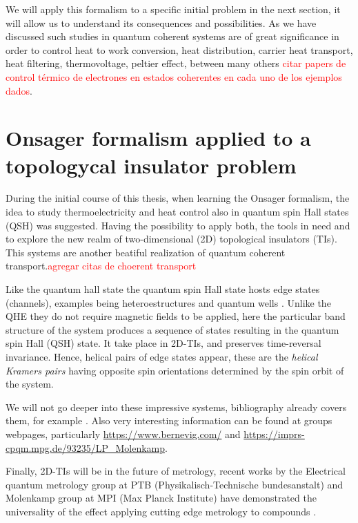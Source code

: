 We will apply this formalism to a specific initial problem in the next section, it will allow us to understand its consequences and possibilities. As we have discussed such studies in quantum coherent systems are of great significance in order to control heat to work conversion, heat distribution, carrier heat transport, heat filtering, thermovoltage, peltier effect, between many others \textcolor{red}{citar papers de control térmico de electrones en estados coherentes en cada uno de los ejemplos dados}.


\section{Onsager formalism applied to a\\ topologycal insulator problem}
\label{sec:teo:onsaTopo}


During the initial course of this thesis, when  learning the Onsager formalism, the idea to study thermoelectricity and heat control also in quantum spin Hall states (QSH) was suggested. Having the possibility to apply both, the tools in need and to explore the new realm of two-dimensional (2D) topological insulators (TIs). This systems are another beatiful realization of quantum coherent transport.\textcolor{red}{agregar citas de choerent transport}

Like the quantum hall state the quantum spin Hall state hosts edge states (channels)\cite{nowack2013imaging}, 
examples being  heteroestructures and  quantum wells \cite{konig2008quantum, Koenig766,bernevig2006quantum,bernevig2006prl,bernevig2006qsh}. 
Unlike the QHE they do not require magnetic fields to be applied, here the particular band structure of the system produces a sequence of states resulting in the quantum spin Hall (QSH) state. It take place in 2D-TIs, and preserves time-reversal invariance. Hence, helical pairs of edge states appear, these are the \textit{helical Kramers pairs} \cite{kanemele2005,bernevig2006quantum,Koenig766, Roth2009} having opposite spin orientations determined by the spin orbit of the system.

We will not go deeper into these impressive systems, bibliography already covers them, for example \cite{maciejko2011quantum, konig2008quantum}. Also very interesting information can be found at groups webpages, particularly \url{https://www.bernevig.com/} and \url{https://imprs-cpqm.mpg.de/93235/LP_Molenkamp}.

Finally, 2D-TIs will be in the future of metrology, recent works by the Electrical quantum metrology group at PTB (Physikalisch-Technische bundesanstalt) and Molenkamp group at MPI (Max Planck Institute) have demonstrated the universality of the effect applying cutting edge metrology to  compounds \cite{gotz2018zero}. 


